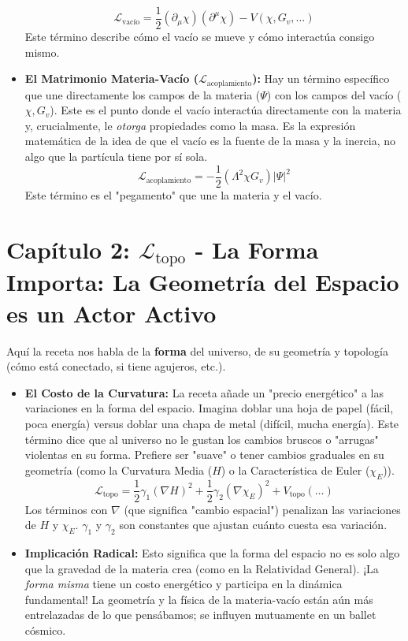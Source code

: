 \begin{itemize}
    \[
    \mathcal{L}_{\text{vacío}} = \frac{1}{2}(\partial_\mu\chi)(\partial^\mu\chi) - V(\chi, G_v, \dots)
    \]
    Este término describe cómo el vacío se mueve y cómo interactúa consigo mismo.
    \item \textbf{El Matrimonio Materia-Vacío ($\mathcal{L}_{\text{acoplamiento}}$):} Hay un término específico que une directamente los campos de la materia ($\Psi$) con los campos del vacío ($\chi, G_v$). Este es el punto donde el vacío interactúa directamente con la materia y, crucialmente, le \textit{otorga} propiedades como la masa. Es la expresión matemática de la idea de que el vacío es la fuente de la masa y la inercia, no algo que la partícula tiene por sí sola.
    \[
    \mathcal{L}_{\text{acoplamiento}} = -\frac{1}{2}(\Lambda^2\chi G_v)|\Psi|^2
    \]
    Este término es el "pegamento" que une la materia y el vacío.
\end{itemize}

\section*{\centering Capítulo 2: $\mathcal{L}_{\text{topo}}$ - La Forma Importa: La Geometría del Espacio es un Actor Activo}

Aquí la receta nos habla de la \textbf{forma} del universo, de su geometría y topología (cómo está conectado, si tiene agujeros, etc.).

\begin{itemize}
    \item \textbf{El Costo de la Curvatura:} La receta añade un "precio energético" a las variaciones en la forma del espacio. Imagina doblar una hoja de papel (fácil, poca energía) versus doblar una chapa de metal (difícil, mucha energía). Este término dice que al universo no le gustan los cambios bruscos o "arrugas" violentas en su forma. Prefiere ser "suave" o tener cambios graduales en su geometría (como la Curvatura Media ($H$) o la Característica de Euler ($\chi_E$)).
    \[
    \mathcal{L}_{\text{topo}} = \frac{1}{2}\gamma_1(\nabla H)^2 + \frac{1}{2}\gamma_2(\nabla\chi_E)^2 + V_{\text{topo}}(\dots)
    \]
    Los términos con $\nabla$ (que significa "cambio espacial") penalizan las variaciones de $H$ y $\chi_E$. $\gamma_1$ y $\gamma_2$ son constantes que ajustan cuánto cuesta esa variación.
    \item \textbf{Implicación Radical:} Esto significa que la forma del espacio no es solo algo que la gravedad de la materia crea (como en la Relatividad General). ¡La \textit{forma misma} tiene un costo energético y participa en la dinámica fundamental! La geometría y la física de la materia-vacío están aún más entrelazadas de lo que pensábamos; se influyen mutuamente en un ballet cósmico.
\end{itemize}


